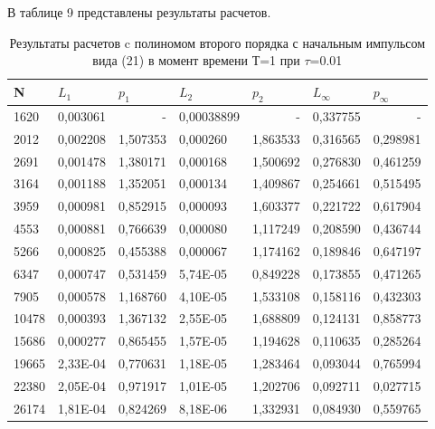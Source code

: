 \documentclass[14pt]{article}
\begin{document}
В таблице 9 представлены результаты расчетов.
\begin{table}[!h!]
\caption{Результаты расчетов c полиномом второго порядка с начальным импульсом вида (21) в момент времени Т=1 при $\tau$=0.01}
\begin{tabular}{|l|l|l|l|l|l|l|}
\hline
\multicolumn{1}{|l|}{N} & \multicolumn{1}{l|}{$L_1$}        & \multicolumn{1}{l|}{$p_1$} & \multicolumn{1}{l|}{$L_2$}     & \multicolumn{1}{l|}{$p_2$} & \multicolumn{1}{l|}{$L_\infty$} & \multicolumn{1}{l|}{$p_\infty$} \\ \hline
1620  & 0,003061 & \multicolumn{1}{r|}{-} & 0,00038899 & \multicolumn{1}{r|}{-}       & 0,337755 & \multicolumn{1}{r|}{-} \\ \hline
2012  & 0,002208 & 1,507353               & 0,000260   & 1,863533 & 0,316565 & 0,298981               \\ \hline
2691  & 0,001478 & 1,380171               & 0,000168   & 1,500692 & 0,276830 & 0,461259               \\ \hline
3164  & 0,001188 & 1,352051               & 0,000134   & 1,409867 & 0,254661 & 0,515495               \\ \hline
3959  & 0,000981 & 0,852915               & 0,000093   & 1,603377 & 0,221722 & 0,617904               \\ \hline
4553  & 0,000881 & 0,766639               & 0,000080   & 1,117249 & 0,208590 & 0,436744               \\ \hline
5266  & 0,000825 & 0,455388               & 0,000067   & 1,174162 & 0,189846 & 0,647197               \\ \hline
6347  & 0,000747 & 0,531459               & 5,74E-05   & 0,849228 & 0,173855 & 0,471265               \\ \hline
7905  & 0,000578 & 1,168760               & 4,10E-05   & 1,533108 & 0,158116 & 0,432303               \\ \hline
10478 & 0,000393 & 1,367132               & 2,55E-05   & 1,688809 & 0,124131 & 0,858773               \\ \hline
15686 & 0,000277 & 0,865455               & 1,57E-05   & 1,194628 & 0,110635 & 0,285264               \\ \hline
19665 & 2,33E-04 & 0,770631               & 1,18E-05   & 1,283464 & 0,093044 & 0,765994               \\ \hline
22380 & 2,05E-04 & 0,971917               & 1,01E-05   & 1,202706 & 0,092711 & 0,027715               \\ \hline
26174 & 1,81E-04 & 0,824269               & 8,18E-06   & 1,332931 & 0,084930 & 0,559765               \\ \hline
\end{tabular}

\end{table}
\end{document}
